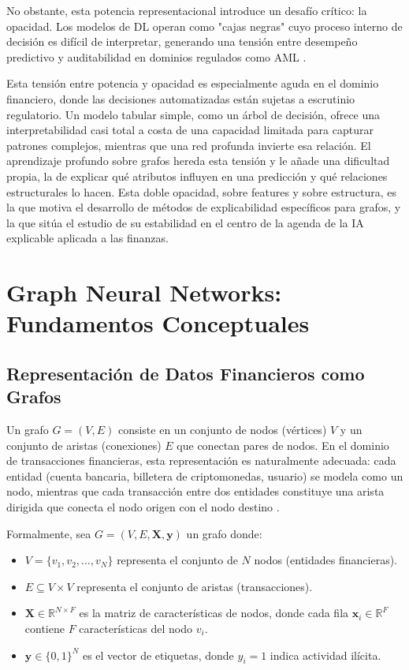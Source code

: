 No obstante, esta potencia representacional introduce un desafío crítico: la opacidad. Los modelos de DL operan como "cajas negras" cuyo proceso interno de decisión es difícil de interpretar, generando una tensión entre desempeño predictivo y auditabilidad en dominios regulados como AML \cite{Gawantka2024AExplanations}.

Esta tensión entre potencia y opacidad es especialmente aguda en el dominio financiero, donde las decisiones automatizadas están sujetas a escrutinio regulatorio. Un modelo tabular simple, como un árbol de decisión, ofrece una interpretabilidad casi total a costa de una capacidad limitada para capturar patrones complejos, mientras que una red profunda invierte esa relación. El aprendizaje profundo sobre grafos hereda esta tensión y le añade una dificultad propia, la de explicar qué atributos influyen en una predicción y qué relaciones estructurales lo hacen. Esta doble opacidad, sobre features y sobre estructura, es la que motiva el desarrollo de métodos de explicabilidad específicos para grafos, y la que sitúa el estudio de su estabilidad en el centro de la agenda de la IA explicable aplicada a las finanzas.

\section{Graph Neural Networks: Fundamentos Conceptuales}

\subsection{Representación de Datos Financieros como Grafos}

Un grafo $G = (V, E)$ consiste en un conjunto de nodos (vértices) $V$ y un conjunto de aristas (conexiones) $E$ que conectan pares de nodos. En el dominio de transacciones financieras, esta representación es naturalmente adecuada: cada entidad (cuenta bancaria, billetera de criptomonedas, usuario) se modela como un nodo, mientras que cada transacción entre dos entidades constituye una arista dirigida que conecta el nodo origen con el nodo destino \cite{Weber2019Anti-MoneyForensics, Lawal2025AnDataset}.

Formalmente, sea $G = (V, E, \mathbf{X}, \mathbf{y})$ un grafo donde:

\begin{itemize}
    \item $V = \{v_1, v_2, \ldots, v_N\}$ representa el conjunto de $N$ nodos (entidades financieras).
    \item $E \subseteq V \times V$ representa el conjunto de aristas (transacciones).
    \item $\mathbf{X} \in \mathbb{R}^{N \times F}$ es la matriz de características de nodos, donde cada fila $\mathbf{x}_i \in \mathbb{R}^F$ contiene $F$ características del nodo $v_i$.
    \item $\mathbf{y} \in \{0,1\}^N$ es el vector de etiquetas, donde $y_i = 1$ indica actividad ilícita.
\end{itemize}

